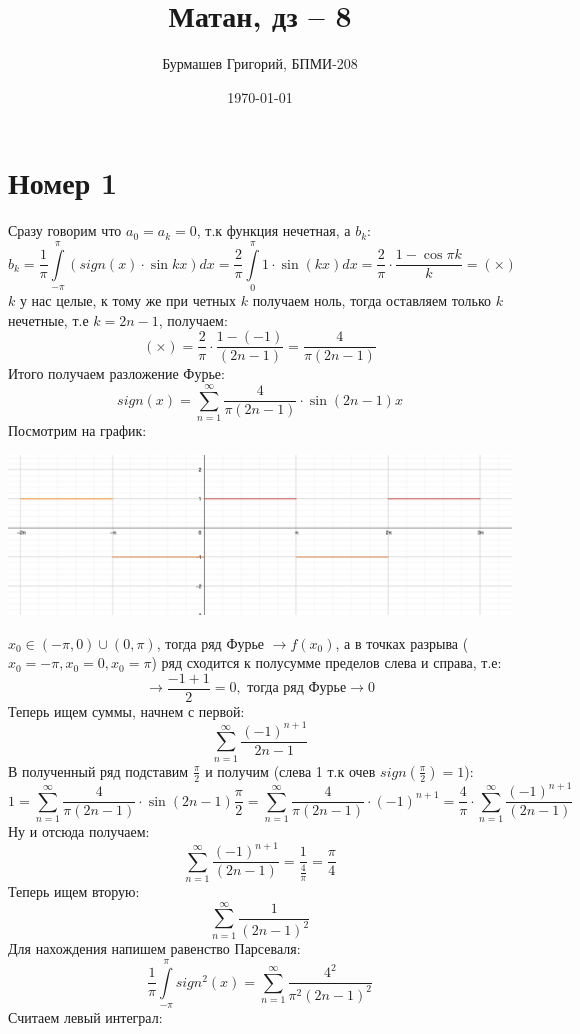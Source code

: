 \documentclass[a4paper,12pt]{article}
\author{Бурмашев Григорий, БПМИ-208}
\title{Матан, дз -- 8}
\date{\today}
\begin{document}
\maketitle
\section*{Номер 1}
Сразу говорим что $a_0 = a_k = 0$, т.к функция нечетная, а $b_k$:
\[
b_k = \frac{1}{\pi} \int\limits_{-\pi}^{\pi} \left( sign (x) \cdot \sin kx \right)dx = \frac{2}{\pi} \int\limits_0^{\pi} 1 \cdot \sin( kx )dx = \frac{2}{\pi} \cdot \frac{1 - \cos \pi k}{k} = (\times)
\] 
$k$ у нас целые, к тому же при четных $k$ получаем ноль, тогда оставляем только $k$ нечетные, т.е $k = 2n - 1$, получаем:
\[
(\times) =\frac{2}{\pi} \cdot \frac{1 - (-1)}{(2n - 1)} = \frac{4}{\pi (2n-1)}
\]
Итого получаем разложение Фурье:
\[
sign(x) = \sum_{n = 1}^{\infty} \frac{4}{\pi(2n - 1)} \cdot \sin(2n -1) x
\]
Посмотрим на график:
\begin{center}
\includegraphics[scale=0.3]{1.png}
\end{center}
$x_0 \in (-\pi, 0) \cup (0, \pi)$, тогда ряд Фурье $\longrightarrow f(x_0)$, а в точках разрыва ($x_0 = -\pi, x_0 = 0, x_0 = \pi$) ряд сходится к полусумме пределов слева и справа, т.е:
\[
\longrightarrow \frac{-1 + 1}{2} = 0 , \text{ тогда ряд Фурье} \longrightarrow 0 
\]
Теперь ищем суммы, начнем с первой:
\[
\sum_{n = 1}^{\infty} \frac{(-1)^{n + 1}}{2n-1}
\]
В полученный ряд подставим $\frac{\pi}{2}$ и получим (слева 1 т.к очев $sign(\frac{\pi}{2}) = 1$):
\[
1 = 
\sum_{n = 1}^{\infty} \frac{4}{\pi(2n - 1)} \cdot \sin(2n -1) \frac{\pi}{2} = \sum_{n = 1}^{\infty} \frac{4}{\pi(2n - 1)} \cdot (-1)^{n + 1} = \frac{4}{\pi} \cdot \sum_{n = 1}^{\infty} \frac{(-1)^{n + 1} }{(2n - 1)}
\]
Ну и отсюда получаем:
\[
\sum_{n = 1}^{\infty} \frac{(-1)^{n + 1} }{(2n - 1)} = \frac{1}{\frac{4}{\pi}} = \frac{\pi}{4}
\]
Теперь ищем вторую:
\[
\sum_{n = 1}^{\infty} \frac{1}{(2n-1)^2}
\]
Для нахождения напишем равенство Парсеваля:
\[
\frac{1}{\pi} \int\limits_{-\pi}^{\pi} sign^2 (x) = \sum_{n = 1}^{\infty} \frac{4^2}{\pi^2 (2n-1)^2}
\]
Считаем левый интеграл:
\end{document}
